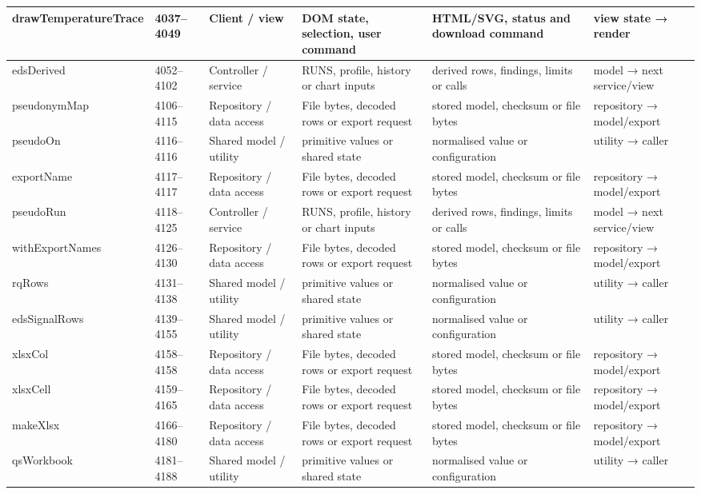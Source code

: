 \begin{landscape}
\begin{longtable}{@{}p{3.2cm}p{1.45cm}p{2.7cm}p{4.0cm}p{4.0cm}p{3.0cm}@{}}
drawTemperatureTrace & 4037--4049 & Client / view & DOM state, selection, user command & HTML/SVG, status and download command & view state → render \\\hline
edsDerived & 4052--4102 & Controller / service & RUNS, profile, history or chart inputs & derived rows, findings, limits or calls & model → next service/view \\\hline
pseudonymMap & 4106--4115 & Repository / data access & File bytes, decoded rows or export request & stored model, checksum or file bytes & repository → model/export \\\hline
pseudoOn & 4116--4116 & Shared model / utility & primitive values or shared state & normalised value or configuration & utility → caller \\\hline
exportName & 4117--4117 & Repository / data access & File bytes, decoded rows or export request & stored model, checksum or file bytes & repository → model/export \\\hline
pseudoRun & 4118--4125 & Controller / service & RUNS, profile, history or chart inputs & derived rows, findings, limits or calls & model → next service/view \\\hline
withExportNames & 4126--4130 & Repository / data access & File bytes, decoded rows or export request & stored model, checksum or file bytes & repository → model/export \\\hline
rqRows & 4131--4138 & Shared model / utility & primitive values or shared state & normalised value or configuration & utility → caller \\\hline
edsSignalRows & 4139--4155 & Shared model / utility & primitive values or shared state & normalised value or configuration & utility → caller \\\hline
xlsxCol & 4158--4158 & Repository / data access & File bytes, decoded rows or export request & stored model, checksum or file bytes & repository → model/export \\\hline
xlsxCell & 4159--4165 & Repository / data access & File bytes, decoded rows or export request & stored model, checksum or file bytes & repository → model/export \\\hline
makeXlsx & 4166--4180 & Repository / data access & File bytes, decoded rows or export request & stored model, checksum or file bytes & repository → model/export \\\hline
qsWorkbook & 4181--4188 & Shared model / utility & primitive values or shared state & normalised value or configuration & utility → caller \\\hline

\end{longtable}
\end{landscape}
